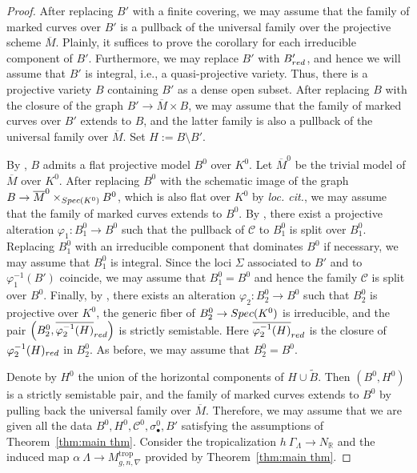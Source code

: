\documentclass[10pt,a4paper]{amsart}
\newcommand{\RR}{{\mathbb R}}
\newcommand{\Spec}{{\rm Spec}}
\newcommand{\cC}{{\mathcal{C}}}
\newcommand{\trop}{\mathrm{trop}}
\begin{document}
\begin{proof}
After replacing $B'$ with a finite covering, we may assume that the family of marked curves over $B'$ is a pullback of the universal family over the projective scheme $\overline M$. Plainly, it suffices to prove the corollary for each irreducible component of $B'$. Furthermore, we may replace $B'$ with $B'_{\rm red}$, and hence we will assume that $B'$ is integral, i.e., a quasi-projective variety. Thus, there is a projective variety $B$ containing $B'$ as a dense open subset. After replacing $B$ with the closure of the graph $B'\to \overline M \times B$, we may assume that the family of marked curves over $B'$ extends to $B$, and the latter family is also a pullback of the universal family over $\overline M$. Set $H:=B\setminus B'$. 

By \cite[\href{https://stacks.math.columbia.edu/tag/0C2S}{Tag~0C2S}]{stacks-project}, $B$ admits a flat projective model $B^0$ over $K^0$. Let $\overline M^0$ be the trivial model of $\overline M$ over $K^0$. After replacing $B^0$ with the schematic image of the graph $B\to \overline M^0 \times_{\Spec(K^0)} B^0$, which is also flat over $K^0$ by {\em loc. cit.}, we may assume that the family of marked curves extends to $B^0$. By \cite[Lemma~5.3]{dJ96}, there exist a projective alteration $\varphi_1 \colon B_1^0 \to B^0$ such that the pullback of $\cC$ to $B_1^0$ is split over $B_1^0$. Replacing $B_1^0$ with an irreducible component that dominates $B^0$ if necessary, we may assume that $B_1^0$ is integral. Since the loci $\Sigma$ associated to $B'$ and to $\varphi_1^{-1}(B')$ coincide, we may assume that $B_1^0=B^0$ and hence the family $\cC$ is split over $B^0$.
Finally, by \cite[Theorem~6.5]{dJ96}, there exists an alteration $\varphi_2 \colon B_2^0 \to B^0$ such that $B_2^0$ is projective over $K^0$, the generic fiber of $B_2^0\to\Spec(K^0)$ is irreducible, and the pair $\left(B_2^0, \overline{\varphi_2^{-1}(H)}_{\rm red}\right)$ is strictly semistable. Here $\overline{\varphi_2^{-1}(H)}_{\rm red}$ is the closure of $\varphi_2^{-1}(H)_{\rm red}$ in $B_2^0$.
As before, we may assume that $B_2^0=B^0$. 

Denote by $H^0$ the union of the horizontal components of $H\cup \tilde{B}$. Then $(B^0, H^0)$ is a strictly semistable pair, and the family of marked curves extends to $B^0$ by pulling back the universal family over $\overline M$. Therefore, we may assume that we are given all the data $B^0, H^0, \cC^0, \sigma^0_\bullet, B'$ satisfying the assumptions of Theorem~\ref{thm:main thm}. Consider the tropicalization $h\: \Gamma_\Lambda\to N_\RR$ and the induced map $\alpha\:\Lambda\to M^{\trop}_{g,n,\nabla}$ provided by Theorem~\ref{thm:main thm}.


\end{proof}
\end{document}
